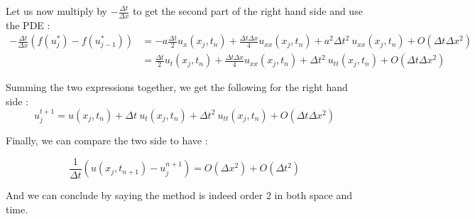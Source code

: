 Let us now multiply by $-\frac{\Delta t}{\Delta x}$ to get the second part of the right hand side and use the PDE : 
\begin{align*}
-\frac{\Delta t}{\Delta x}(f(u_j^*)-f(u_{j-1}^*)) &= -a\frac{\Delta t}{2}u_x(x_j,t_n) + \frac{\Delta t\Delta x}{4}u_{xx}(x_j,t_n) + a^2\Delta t^2 \: u_{xx}(x_j,t_n) + O(\Delta t\Delta x^2)\\
&= \frac{\Delta t}{2} u_t(x_j,t_n) + \frac{\Delta t\Delta x}{4}u_{xx}(x_j,t_n) + \Delta t^2 \: u_{tt}(x_j,t_n) + O(\Delta t\Delta x^2)
\end{align*}

Summing the two expressions together, we get the following for the right hand side :
$$u_j^{t+1} = u(x_j,t_n) + \Delta t \: u_t(x_j,t_n) + \Delta t^2 \: u_{tt}(x_j,t_n) + O(\Delta t\Delta x^2)$$

Finally, we can compare the two side to have :

$$\frac{1}{\Delta t}(u(x_j,t_{n+1})-u_j^{n+1}) = O(\Delta x^2) + O(\Delta t^2)$$

And we can conclude by saying the method is indeed order 2 in both space and time.








